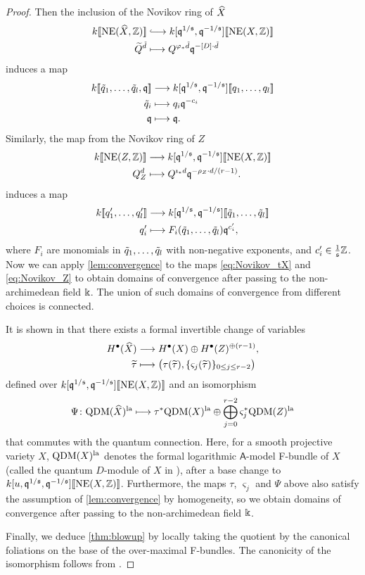 \documentclass[twoside,leqno]{article}
\numberwithin{equation}{section}
\theoremstyle{plain}
\theoremstyle{definition}
\begin{document}
\begin{proof}
Then the inclusion of the Novikov ring of $\widehat{X}$
\begin{align*}
  k\dbb{\NE(\tX, \bbZ)} &\hooklongrightarrow k[\fq^{1/\fs}, \fq^{-1/\fs}]\dbb{\NE(X,\bbZ)} \\
  \tQ^{\td} &\longmapsto Q^{\varphi_* \td} \fq^{-[D] \cdot \td}
\end{align*}
induces a map
\begin{align} \label{eq:Novikov_tX}
  k[\![\tilde q_1,\dots,\tilde q_l,\mathfrak q]\!] &\longrightarrow k[\mathfrak q^{1/\mathfrak s}, \mathfrak q^{-1/\mathfrak s}][\![q_1,\dots,q_l]\!] \\
  \tilde q_i &\longmapsto q_i \mathfrak q^{-c_i} \nonumber \\
  \mathfrak q &\longmapsto \mathfrak q . \nonumber
\end{align}
Similarly, the map from the Novikov ring of $Z$
\begin{align*}
  k[\![\operatorname{NE}(Z, \mathbb Z)]\!] &\longrightarrow k[\mathfrak q^{1/\mathfrak s}, \mathfrak q^{-1/\mathfrak s}][\![\operatorname{NE}(X,\mathbb Z)]\!] \\
  Q_Z^d &\longmapsto Q^{\imath_* d} \mathfrak q^{-\rho_Z \cdot d / (r-1)} .
\end{align*}
induces a map
\begin{align} \label{eq:Novikov_Z}
  k[\![q'_1,\dots,q'_l]\!] &\longrightarrow k[\mathfrak q^{1/\mathfrak s}, \mathfrak q^{-1/\mathfrak s}][\![\tilde q_1,\dots,\tilde q_l]\!] \\
  q'_i &\longmapsto F_i(\tilde q_1, \dots, \tilde q_l) \mathfrak q^{c'_i}, \nonumber
\end{align}
where $F_i$ are monomials in $\tilde q_1, \dots, \tilde q_l$ with non-negative exponents, and $c'_i \in \frac{1}{\mathfrak s}\mathbb Z$. Now we can apply \cref{lem:convergence} to the maps \eqref{eq:Novikov_tX} and \eqref{eq:Novikov_Z} to obtain domains of convergence after passing to the non-archimedean field $\Bbbk$.
The union of such domains of convergence from different choices is connected.

It is shown in \cite[Theorem 5.18]{Iritani_blowup} that there exists a formal invertible change of variables
\begin{align*}
H^{\bullet}(\widehat{X}) &\longrightarrow H^{\bullet}(X) \oplus H^{\bullet}(Z)^{\oplus(r-1)}, \\
\widetilde\tau &\longmapsto \big(\tau(\widetilde\tau), \{ \varsigma_j(\widetilde\tau)\}_{0 \le j \le r-2}\big)
\end{align*}
defined over $k[\mathfrak q^{1/\mathfrak s}, \mathfrak q^{-1/\mathfrak s}][\![\operatorname{NE}(X,\mathbb Z)]\!]$ and an isomorphism
\[ \Psi \colon \mathrm{QDM}(\widehat{X})^{\mathrm{la}} \longmapsto \tau^*\mathrm{QDM}(X)^{\mathrm{la}} \oplus \bigoplus_{j=0}^{r-2} \varsigma_j^*\mathrm{QDM}(Z)^{\mathrm{la}} \]
that commutes with the quantum connection.
Here, for a smooth projective variety $X$,  $\mathrm{QDM}(X)^{\mathrm{la}}$ denotes the formal logarithmic $\mathsf{A}$-model F-bundle of $X$ (called the quantum $D$-module of $X$ in \cite{Iritani_blowup}), after a  base change to $k[u, \mathfrak q^{1/\mathfrak s}, \mathfrak q^{-1/\mathfrak s}][\![\operatorname{NE}(X,\mathbb Z)]\!]$.
Furthermore, the maps $\tau$, $\varsigma_j$ and $\Psi$ above also satisfy the assumption of \cref{lem:convergence} by  homogeneity, so we obtain domains of convergence after passing to the non-archimedean field $\Bbbk$.

Finally, we deduce \cref{thm:blowup} by locally taking the quotient by the canonical foliations on the base of the over-maximal F-bundles.
The canonicity of the isomorphism follows from \cite[\S 5.4]{HYZZ_Decomposition}.
\end{proof}
\end{document}
